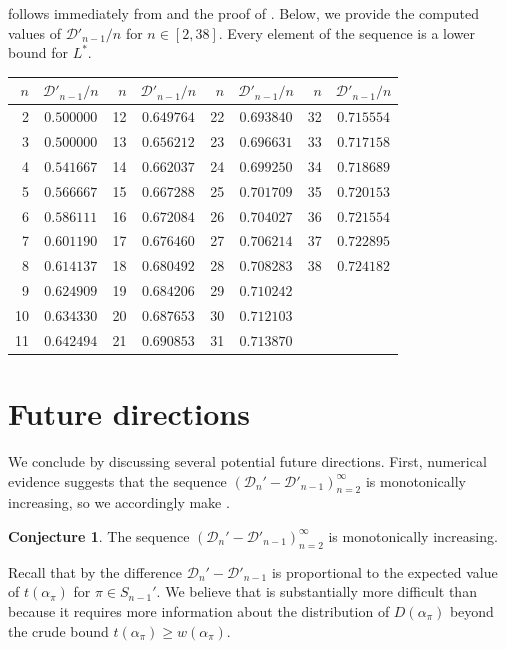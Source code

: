 \documentclass[12pt]{amsart}
\theoremstyle{definition}
\newtheorem{conjecture}[theorem]{Conjecture}
\begin{document}
 follows immediately from  and the proof of . Below, we provide the computed values of $\mathcal{D}'_{n-1}/n$ for $n\in [2, 38]$. Every element of the sequence is a lower bound for $L^*$.

\begin{table}[ht]
\centering
\renewcommand{\arraystretch}{1.2}
\begin{tabular}{r c | r c | r c | r c}
\toprule
$n$ & $\mathcal{D}'_{n-1}/n$ & $n$ & $\mathcal{D}'_{n-1}/n$ & $n$ & $\mathcal{D}'_{n-1}/n$ & $n$ & $\mathcal{D}'_{n-1}/n$ \\
\midrule
 2 & $0.500000$ & 12 & $0.649764$ & 22 & $0.693840$ & 32 & $0.715554$ \\
 3 & $0.500000$ & 13 & $0.656212$ & 23 & $0.696631$ & 33 & $0.717158$ \\
 4 & $0.541667$ & 14 & $0.662037$ & 24 & $0.699250$ & 34 & $0.718689$ \\
 5 & $0.566667$ & 15 & $0.667288$ & 25 & $0.701709$ & 35 & $0.720153$ \\
 6 & $0.586111$ & 16 & $0.672084$ & 26 & $0.704027$ & 36 & $0.721554$ \\
 7 & $0.601190$ & 17 & $0.676460$ & 27 & $0.706214$ & 37 & $0.722895$ \\
 8 & $0.614137$ & 18 & $0.680492$ & 28 & $0.708283$ & 38 & $0.724182$ \\
 9 & $0.624909$ & 19 & $0.684206$ & 29 & $0.710242$ &    &            \\
10 & $0.634330$ & 20 & $0.687653$ & 30 & $0.712103$ &    &            \\
11 & $0.642494$ & 21 & $0.690853$ & 31 & $0.713870$ &    &            \\
\bottomrule
\end{tabular}
\end{table}

\section{Future directions}\label{sec:future}


We conclude by discussing several potential future directions. First, numerical evidence suggests that the sequence $(\mathcal{D}_{n}' - \mathcal{D}'_{n-1})_{n=2}^{\infty}$ is monotonically increasing, so we accordingly make . 
\begin{conjecture}\label{conj:r}
The sequence $(\mathcal{D}_{n}' - \mathcal{D}'_{n-1})_{n=2}^{\infty}$ is monotonically increasing.
\end{conjecture}
Recall that by  the difference $\mathcal{D}_{n}'-\mathcal{D}'_{n-1}$ is proportional to the expected value of $t(\alpha_{\pi})$ for $\pi\in S_{n-1}'$. We believe that  is substantially more difficult than  because it requires more information about the distribution of $D(\alpha_{\pi})$ beyond the crude bound $t(\alpha_{\pi})\ge w(\alpha_{\pi})$.
\end{document}
